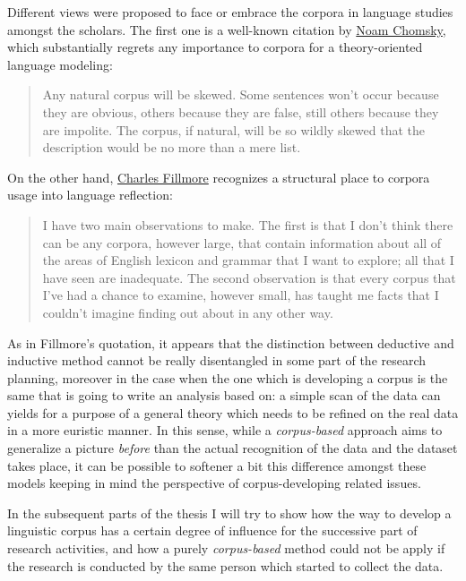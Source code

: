 \documentclass[a4paper,twoside,12pt,chapterprefix=false,bibliography=totocnumbered,listof=flat]{scrbook}
\begin{document}
Different views were proposed to face or embrace the corpora in language
studies amongst the scholars. The first one is a well-known citation by
\href{https://en.wikipedia.org/wiki/Noam_Chomsky}{Noam Chomsky}, which
substantially regrets any importance to corpora for a theory-oriented
language modeling:

\begin{quote}
Any natural corpus will be skewed. Some sentences won't occur because
they are obvious, others because they are false, still others because
they are impolite. The corpus, if natural, will be so wildly skewed that
the description would be no more than a mere list. \citep[Chomsky 1962,
\emph{A transformational approach to syntax} in][]{togninibonelli2001}
\end{quote}

On the other hand,
\href{https://en.wikipedia.org/wiki/Charles_J._Fillmore}{Charles
Fillmore} recognizes a structural place to corpora usage into language
reflection:

\begin{quote}
I have two main observations to make. The first is that I don't think
there can be any corpora, however large, that contain information about
all of the areas of English lexicon and grammar that I want to explore;
all that I have seen are inadequate. The second observation is that
every corpus that I've had a chance to examine, however small, has
taught me facts that I couldn't imagine finding out about in any other
way. \citep{fillmore1992}
\end{quote}

As in Fillmore's quotation, it appears that the distinction between
deductive and inductive method cannot be really disentangled in some
part of the research planning, moreover in the case when the one which
is developing a corpus is the same that is going to write an analysis
based on: a simple scan of the data can yields for a purpose of a
general theory which needs to be refined on the real data in a more
euristic manner. In this sense, while a \emph{corpus-based} approach
aims to generalize a picture \emph{before} than the actual recognition
of the data and the dataset takes place, it can be possible to softener
a bit this difference amongst these models keeping in mind the
perspective of corpus-developing related issues.

In the subsequent parts of the thesis I will try to show how the way to
develop a linguistic corpus has a certain degree of influence for the
successive part of research activities, and how a purely
\emph{corpus-based} method could not be apply if the research is
conducted by the same person which started to collect the data.
\end{document}
